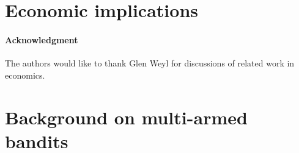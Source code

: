 \documentclass[11pt]{article}
\begin{document}
\section{Economic implications}
\label{sec:welfare}


\paragraph{Acknowledgment}{ The authors would like to thank Glen Weyl
  for discussions of related work in economics.  }


% 
 


\appendix

\section{Background on multi-armed bandits}
\label{app:examples}

\end{document}
